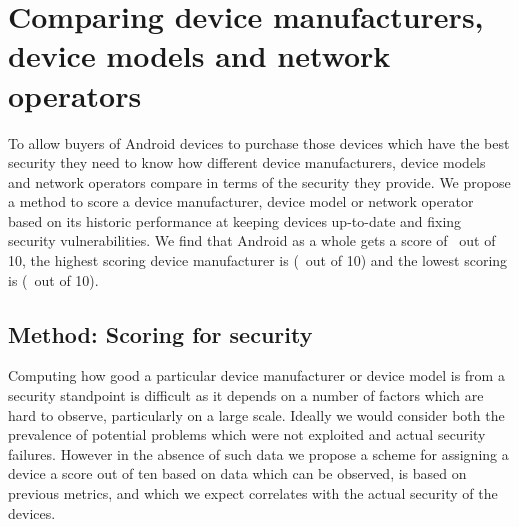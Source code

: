 \section{Comparing device manufacturers, device models and network operators}
\label{sec:security_scoring}\label{sec:exp:security_score}

To allow buyers of Android devices to purchase those devices which have the best security they need to know how different device manufacturers, device models and network operators compare in terms of the security they provide.
We propose a method to score a device manufacturer, device model or network operator based on its historic performance at keeping devices up-to-date and fixing security vulnerabilities.
We find that Android as a whole gets a score of \daSecurityScore\ out of 10, the highest scoring device manufacturer is \emph{\daSecScoreBestmanufacturer} (\daSecScoreBestmanufacturerScore\ out of 10) and the lowest scoring is \emph{\daSecScoreWorstmanufacturer} (\daSecScoreWorstmanufacturerScore\ out of 10).

\subsection{Method: Scoring for security}\label{sec:security_scoring:method}

Computing how good a particular device manufacturer or device model is from a security standpoint is difficult as it depends on a number of factors which are hard to observe, particularly on a large scale.
Ideally we would consider both the prevalence of potential problems which were not exploited and actual security failures.
However in the absence of such data we propose a scheme for assigning a device a score out of ten based on data which can be observed, is based on previous metrics, and which we expect correlates with the actual security of the devices.

